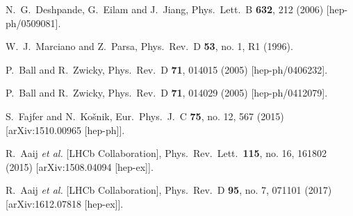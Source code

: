 \documentclass[preprint,prd,aps,tighten,nofootinbib,amssymb]{revtex4}
\begin{document}
\begin{thebibliography}{99}
  
  N.~G.~Deshpande, G.~Eilam and J.~Jiang,
  Phys.\ Lett.\ B {\bf 632}, 212 (2006)
  [hep-ph/0509081].
  
  W.~J.~Marciano and Z.~Parsa,
  Phys.\ Rev.\ D {\bf 53}, no. 1, R1 (1996).
  
  P.~Ball and R.~Zwicky,
  Phys.\ Rev.\ D {\bf 71}, 014015 (2005)
  [hep-ph/0406232].
  
  P.~Ball and R.~Zwicky,
  Phys.\ Rev.\ D {\bf 71}, 014029 (2005)
  [hep-ph/0412079].
  
  S.~Fajfer and N.~Košnik,
  Eur.\ Phys.\ J.\ C {\bf 75}, no. 12, 567 (2015)
  [arXiv:1510.00965 [hep-ph]].
  
  R.~Aaij {\it et al.} [LHCb Collaboration],
  Phys.\ Rev.\ Lett.\  {\bf 115}, no. 16, 161802 (2015)
  [arXiv:1508.04094 [hep-ex]].
  
  R.~Aaij {\it et al.} [LHCb Collaboration],
  Phys.\ Rev.\ D {\bf 95}, no. 7, 071101 (2017)
  [arXiv:1612.07818 [hep-ex]].
    

\end{thebibliography}
\end{document}
